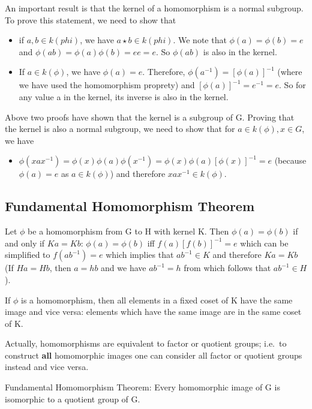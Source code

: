An important result is that the kernel of a homomorphism is a normal
subgroup. To prove this statement, we need to show that

\begin{itemize}
\item
  if \(a, b \in k(phi)\), we have \(a \star b \in k(phi)\). We note that
  \(\phi(a) = \phi(b) = e\) and
  \(\phi(ab) = \phi(a) \phi(b) = e e = e\). So \(\phi(ab)\) is also in
  the kernel.
\item
  If \(a \in k(\phi)\), we have \(\phi(a) = e\). Therefore,
  \(\phi(a^{-1}) = [\phi(a)]^{-1}\) (where we have used the homomorphism
  proprety) and \([\phi(a)]^{-1} = e^{-1} = e\). So for any value a in
  the kernel, its inverse is also in the kernel.
\end{itemize}

Above two proofs have shown that the kernel is a subgroup of G. Proving
that the kernel is also a normal subgroup, we need to show that for
\(a \in k(\phi), x \in G\), we have

\begin{itemize}

\item
  \(\phi(xax^{-1}) = \phi(x) \phi(a) \phi(x^{-1}) = \phi(x) \phi(a) [\phi(x)]^{-1} = e\)
  (because \(\phi(a) = e\) as \(a \in k(\phi)\)) and therefore
  \(xax^{-1} \in k(\phi)\).
\end{itemize}

\subsection{Fundamental Homomorphism
Theorem}\label{fundamental-homomorphism-theorem}

Let \(\phi\) be a homomorphism from G to H with kernel K. Then
\(\phi(a) = \phi(b)\) if and only if \(Ka = Kb\): \(\phi(a) = \phi(b)\)
iff \(f(a) [f(b)]^{-1} = e\) which can be simplified to
\(f(a b^{-1}) = e\) which implies that \(ab^{-1} \in K\) and therefore
\(Ka = Kb\) (If \(Ha = Hb\), then \(a = hb\) and we have \(ab^{-1}=h\)
from which follows that \(ab^{-1} \in H\)).

If \(\phi\) is a homomorphism, then all elements in a fixed coset of K
have the same image and vice versa: elements which have the same image
are in the same coset of K.

Actually, homomorphisms are equivalent to factor or quotient groups;
i.e.~to construct \textbf{all} homomorphic images one can consider all
factor or quotient groups instead and vice versa.

Fundamental Homomorphism Theorem: Every homomorphic image of G is
isomorphic to a quotient group of G.
